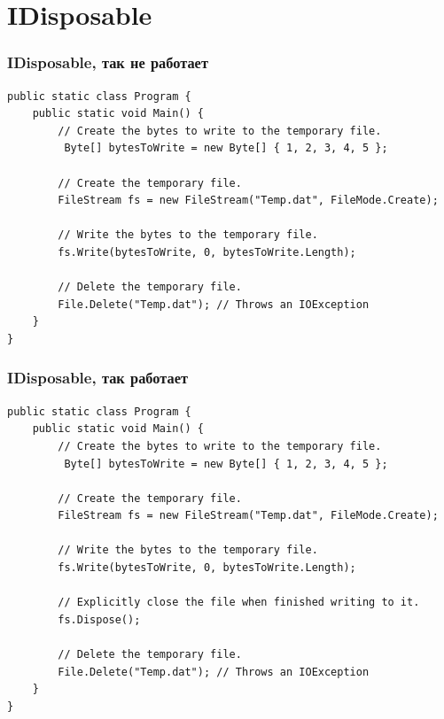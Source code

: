 \documentclass{../../slides-style}
\begin{document}
    \section{IDisposable}

    \begin{frame}[fragile]
        \frametitle{IDisposable, так не работает}
        \begin{scriptsize}
            \begin{verbatim}
public static class Program {
    public static void Main() {
        // Create the bytes to write to the temporary file.
         Byte[] bytesToWrite = new Byte[] { 1, 2, 3, 4, 5 };

        // Create the temporary file.
        FileStream fs = new FileStream("Temp.dat", FileMode.Create);

        // Write the bytes to the temporary file.
        fs.Write(bytesToWrite, 0, bytesToWrite.Length);

        // Delete the temporary file.
        File.Delete("Temp.dat"); // Throws an IOException
    }
}
            \end{verbatim}
        \end{scriptsize}
    \end{frame}

    \begin{frame}[fragile]
        \frametitle{IDisposable, так работает}
        \begin{scriptsize}
            \begin{verbatim}
public static class Program {
    public static void Main() {
        // Create the bytes to write to the temporary file.
         Byte[] bytesToWrite = new Byte[] { 1, 2, 3, 4, 5 };

        // Create the temporary file.
        FileStream fs = new FileStream("Temp.dat", FileMode.Create);

        // Write the bytes to the temporary file.
        fs.Write(bytesToWrite, 0, bytesToWrite.Length);

        // Explicitly close the file when finished writing to it.
        fs.Dispose();

        // Delete the temporary file.
        File.Delete("Temp.dat"); // Throws an IOException
    }
}
            \end{verbatim}
        \end{scriptsize}
    \end{frame}
\end{document}
